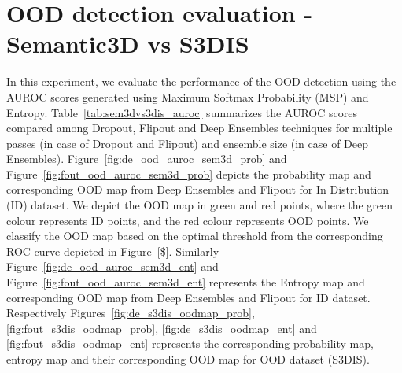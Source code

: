     \section{OOD detection evaluation - Semantic3D vs S3DIS}
    In this experiment, we evaluate the performance of the OOD detection using the AUROC scores generated using Maximum Softmax Probability (MSP) and Entropy.
    Table~\ref{tab:sem3dvs3dis_auroc} summarizes the AUROC scores compared among Dropout, Flipout and Deep Ensembles techniques for multiple passes (in case of Dropout and Flipout) and ensemble size (in case of Deep Ensembles).
    Figure~\ref{fig:de_ood_auroc_sem3d_prob} and Figure~\ref{fig:fout_ood_auroc_sem3d_prob} depicts the probability map and corresponding OOD map from Deep Ensembles and Flipout for In Distribution (ID) dataset.
    We depict the OOD map in green and red points, where the green colour represents ID points, and the red colour represents OOD points.
    We classify the OOD map based on the optimal threshold from the corresponding ROC curve depicted in Figure~[\$].
    Similarly Figure~\ref{fig:de_ood_auroc_sem3d_ent} and Figure~\ref{fig:fout_ood_auroc_sem3d_ent} represents the Entropy map and corresponding OOD map from Deep Ensembles and Flipout for ID dataset.
    Respectively Figures~\ref{fig:de_s3dis_oodmap_prob}, \ref{fig:fout_s3dis_oodmap_prob}, \ref{fig:de_s3dis_oodmap_ent} and \ref{fig:fout_s3dis_oodmap_ent} represents the corresponding probability map, entropy map and their corresponding OOD map for OOD dataset (S3DIS).
    

